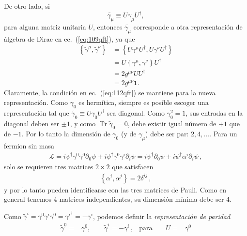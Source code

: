 De otro lado, si
\begin{equation}
  \tilde{\gamma_\mu}\equiv U\gamma_\mu U^\dagger,
\end{equation}
para alguna matriz unitaria $U$, entonces $\tilde{\gamma_\mu}$ corresponde a otra representación de álgebra de Dirac en ec.~(\ref{eq:109qft}), ya que
\begin{align}
  \left\{\tilde\gamma^\mu,\tilde\gamma^\nu\right\}&=\left\{U\gamma^\mu U^\dagger,U\gamma^\nu U^\dagger\right\}\nonumber\\
  &=U\left\{\gamma^\mu,\gamma^\nu\right\}U^\dagger\nonumber\\
  &=2g^{\mu\nu}UU^\dagger\nonumber\\
  &=2g^{\mu\nu}\mathbf{1}.
\end{align}
Claramente, la condición en ec.~(\ref{eq:112qft}) se mantiene para la nueva representación. Como $\gamma_0$ es hermítica, siempre es posible escoger una representación tal que $\tilde{\gamma_0}\equiv U\gamma_0U^\dagger$ sea diagonal. Como $\gamma_0^2=1$, sus entradas en la diagonal deben ser $\pm1$, y como $\operatorname{Tr}\tilde\gamma_0=0$, debe existir igual número de $+1$ que de $-1$. Por lo tanto la dimensión de $\gamma_0$ (y de $\gamma_\mu$) debe ser par: $2,4,\ldots$. Para un fermion sin masa
\begin{align}
  \mathcal{L}=i\psi^\dagger\gamma^0\gamma^0\partial_0\psi+i\psi^\dagger\gamma^0\gamma^i\partial_i\psi=i\psi^\dagger\partial_0\psi+i\psi^\dagger\alpha^i\partial_i\psi\,,
\end{align}
solo se requieren tres matrices $2\times 2$ que satisfacen
\begin{align}
  \left\{\alpha^i,\alpha^j\right\} =2\delta^{ij}\,,
\end{align}
y por lo tanto pueden identificarse con las tres matrices de Pauli. 
Como en general tenemos 4 matrices independientes, su dimensión mínima debe ser 4.

Como $\tilde\gamma^i=\gamma^0\gamma^i\gamma^0={\gamma^i}^\dagger=-\gamma^i$, podemos definir la \emph{representación de paridad}
\begin{align}
\label{eq:parityrep}
\tilde\gamma^0=&\gamma^0,\qquad\tilde\gamma^i=-\gamma^i\,,&\text{para}\qquad U=&\gamma^0   
\end{align}




